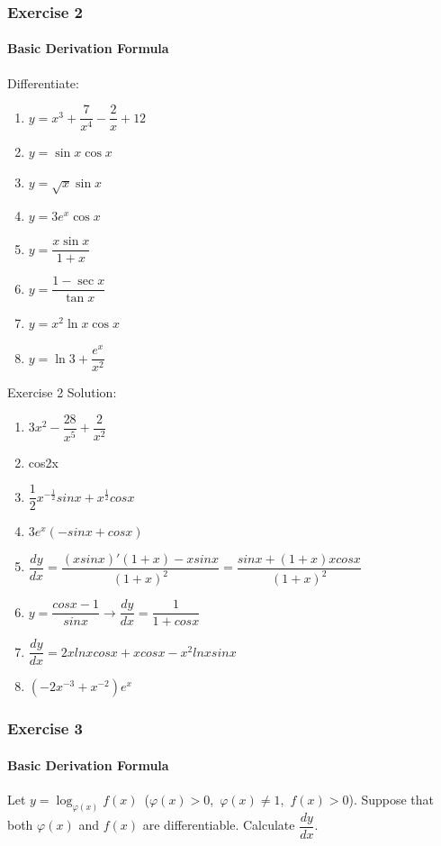 \begin{frame}
    \frametitle{Exercise 2}
    \framesubtitle{Basic Derivation Formula}
    Differentiate:
    \begin{enumerate}
        \item $y = x^{3} + \dfrac{7}{x^{4}} - \dfrac{2}{x} + 12$
        \item $y = \sin{x}\cos{x}$
        \item $y = \sqrt{x}\sin{x}$
        \item $y = 3e^{x}\cos{x}$
        \item $y = \dfrac{x\sin{x}}{1 + x}$
        \item $y = \dfrac{1 - \sec{x}}{\tan{x}}$
        \item $y = x^{2}\ln{x}\cos{x}$
        \item $y = \ln{3} + \dfrac{e^{x}}{x^{2}}$
    \end{enumerate}
\end{frame}



\begin{frame}{Exercise 2}
    Solution:

    \begin{enumerate}
        \item $3x^2 - \dfrac{28}{x^5} + \dfrac{2}{x^2}$
        \item cos2x
        \item $\dfrac{1}{2}x^{-\frac{1}{2}}sinx + x^{\frac{1}{2}}cosx$
        \item $3e^x(-sinx + cosx)$
        \item $\dfrac{dy}{dx} = \dfrac{(xsinx)'(1+x)-xsinx}{(1+x)^2} = \dfrac{sinx + (1+x)xcosx}{(1+x)^2}$
        \item $y = \dfrac{cosx-1}{sinx}  \rightarrow \dfrac{dy}{dx} = \dfrac{1}{1+cosx}$
        \item $\dfrac{dy}{dx} = 2xlnxcosx + xcosx - x^2lnxsinx$
        \item $(-2x^{-3} + x^{-2})e^x$
    \end{enumerate}

\end{frame}



\begin{frame}
    \frametitle{Exercise 3}
    \framesubtitle{Basic Derivation Formula}
    Let $y = \log_{\varphi (x)}{f(x)}$\ ($\varphi (x) > 0$,\ $\varphi (x) \neq 1$,\ $f(x) > 0$). Suppose that both $\varphi (x)$ and $f(x)$ are differentiable. Calculate $\dfrac{dy}{dx}$.
\end{frame}



